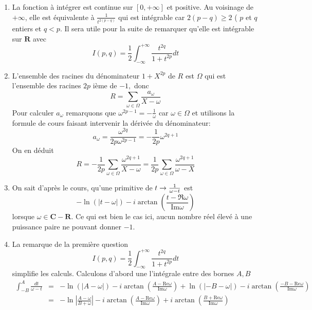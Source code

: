 \begin{enumerate}

\item  La fonction \`{a} int\'{e}grer est continue sur $\left[ 0,+\infty
\right] $ et positive. Au voisinage de $+\infty $, elle est \'{e}quivalente
\`{a} $\frac{1}{t^{2(p-q)}}$ qui est int\'{e}grable car $2(p-q)\geq 2$ ( $p$
et $q$ entiers et $q<p$. Il sera utile pour la suite de remarquer qu'elle
est int\'{e}grable sur $\mathbf{R}$ avec
\[
I(p,q)=\frac{1}{2}\int_{-\infty }^{+\infty }\frac{t^{2q}}{1+t^{2p}}dt
\]

\item  L'ensemble des racines du d\'{e}nominateur $1+X^{2p}$ de $R$ est $\Omega$ qui est l'ensemble des racines $2p$ i\`{e}me de $-1,$ donc
\[
R=\sum_{\omega \in \Omega }\frac{a_{\omega }}{X-\omega }
\]
Pour calculer $a_{\omega }$ remarquons que $\omega ^{2p-1}=-\frac{1}{\omega }
$ car $\omega \in \Omega $ et utilisons la formule de cours faisant
intervenir la d\'{e}riv\'{e}e du d\'{e}nominateur: 
\[
a_{\omega }=\frac{\omega ^{2q}}{2p\omega ^{2p-1}}=-\frac{1}{2p}\omega
^{2q+1} 
\]
On en d\'{e}duit 
\[
R=-\frac{1}{2p}\sum_{\omega \in \Omega }\frac{\omega ^{2q+1}}{X-\omega }=%
\frac{1}{2p}\sum_{\omega \in \Omega }\frac{\omega ^{2q+1}}{\omega -X} 
\]

\item  On sait d'apr\`{e}s le cours, qu'une primitive de $t\rightarrow \frac{%
1}{\omega -t}$ est 
\[
-\ln (\left| t-\omega \right| )-i\arctan (\frac{t-\Re\omega }{\mathrm{Im}%
\omega }) 
\]
lorsque $\omega \in \mathbf{C-\mathbf{R}}$. Ce qui est bien le cas ici,
aucun nombre r\'{e}el \'{e}lev\'{e} \`{a} une puissance paire ne pouvant
donner $-1$.

\item  La remarque de la premi\`{e}re question 
\[
I(p,q)=\frac{1}{2}\int_{-\infty }^{+\infty }\frac{t^{2q}}{1+t^{2p}}dt 
\]
simplifie les calculs. Calculons d'abord une l'int\'{e}grale entre des
bornes $A,B$%
\begin{eqnarray*}
\int_{-B}^{A}\frac{dt}{\omega -t} &=&-\ln (\left| A-\omega \right|
)-i\arctan (\frac{A-\mathrm{Re}\omega }{\mathrm{Im}\omega })+\ln (\left|
-B-\omega \right| )-i\arctan (\frac{-B-\mathrm{Re}\omega }{\mathrm{Im}\omega })
\\
&=&-\ln \left| \frac{A-\omega }{B+\omega }\right| -i\arctan (\frac{A-\mathrm{Re%
}\omega }{\mathrm{Im}\omega })+i\arctan (\frac{B+\mathrm{Re}\omega }{\mathrm{Im}%
\omega })
\end{eqnarray*}


\end{enumerate}
